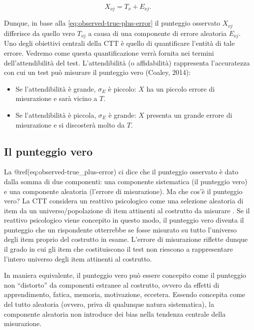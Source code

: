 \documentclass[
  11pt,
]{krantz}
\providecommand{\tightlist}{%
  \setlength{\itemsep}{0pt}\setlength{\parskip}{0pt}}
\theoremstyle{definition}
\theoremstyle{definition}
\theoremstyle{definition}
\theoremstyle{definition}
\theoremstyle{remark}
\begin{document}
\[
X_{\nu j} = T_{\nu} + E_{\nu j}. 
\label{eq:observed-true-plus-error}
\]

Dunque, in base alla \eqref{eq:observed-true-plus-error} il punteggio osservato \(X_{\nu j}\) differisce da quello vero \(T_{\nu j}\) a causa di una componente di errore aleatoria \(E_{\nu j}\). Uno degli obiettivi centrali della CTT è quello di quantificare l'entità di tale errore. Vedremo come questa quantificazione verrà fornita nei termini dell'attendibilità del test. L'attendibilità (o affidabilità) rappresenta l'accuratezza con cui un test può misurare il punteggio vero (Coaley, 2014):

\begin{itemize}
\tightlist
\item
  Se l'attendibilità è grande, \(\sigma_E\) è piccolo: \(X\) ha un piccolo errore di misurazione e sarà vicino a \(T\).
\item
  Se l'attendibilità è piccola, \(\sigma_E\) è grande: \(X\) presenta un grande errore di misurazione e si discosterà molto da \(T\).
\end{itemize}

\hypertarget{il-punteggio-vero}{%
\subsection{Il punteggio vero}\label{il-punteggio-vero}}

La @ref(eq:observed-true\_plus-error) ci dice che il punteggio osservato è dato dalla somma di due componenti: una componente sistematica (il punteggio vero) e una componente aleatoria (l'errore di misurazione). Ma che cos'è il punteggio vero? La CTT considera un reattivo psicologico come una selezione aleatoria di item da un universo/popolazione di item attinenti al costrutto da misurare \citep{nunnally1994psychometric, kline2013handbook}. Se il reattivo psicologico viene concepito in questo modo, il punteggio vero diventa il punteggio che un rispondente otterrebbe se fosse misurato su tutto l'universo degli item proprio del costrutto in esame. L'errore di misurazione riflette dunque il grado in cui gli item che costituiscono il test non riescono a rappresentare l'intero universo degli item attinenti al costrutto.

In maniera equivalente, il punteggio vero può essere concepito come il punteggio non ``distorto'' da componenti estranee al costrutto, ovvero da effetti di apprendimento, fatica, memoria, motivazione, eccetera. Essendo concepita come del tutto aleatoria (ovvero, priva di qualunque natura sistematica), la componente aleatoria non introduce dei bias nella tendenza centrale della misurazione.
\end{document}
